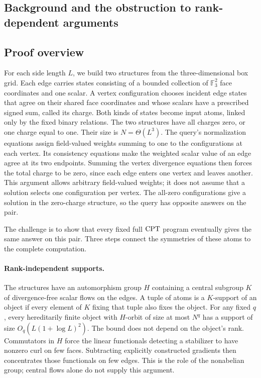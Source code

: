 \subsection{Background and the obstruction to rank-dependent arguments}


\subsection{Proof overview}

For each side length $L$, we build two structures from the
three-dimensional box grid. Each edge carries states consisting of a
bounded collection of $\mathbb F_3^2$ face coordinates and one scalar.
A vertex configuration chooses incident edge states that agree on their
shared face coordinates and whose scalars have a prescribed signed sum,
called its charge. Both kinds of
states become input atoms, linked only by the fixed binary relations.
The two structures have all charges zero, or one charge equal to one.
Their size is $N=\Theta(L^3)$. The query's normalization equations assign
field-valued weights summing to one to the configurations at each vertex.
Its consistency equations make the weighted scalar value of an edge
agree at its two endpoints. Summing the vertex divergence equations then
forces the total charge to be zero, since each edge enters one vertex and
leaves another. This argument allows arbitrary field-valued weights;
it does not assume that a solution selects one configuration per vertex.
The all-zero configurations give a solution in the zero-charge structure,
so the query has opposite answers on the pair.

The challenge is to show that every fixed full $\mathrm{CPT}$ program eventually
gives the same answer on this pair. Three steps connect the symmetries of
these atoms to the complete computation.

\paragraph{Rank-independent supports.}
The structures have an automorphism group $H$ containing a central
subgroup $K$ of divergence-free scalar flows on the edges. A tuple of
atoms is a $K$-support of an object if every element of $K$ fixing that
tuple also fixes the object. For any fixed $q$, every hereditarily finite
object with $H$-orbit of size at most $N^q$ has a support of size
$O_q(L(1+\log L)^2)$. The bound does not depend on the object's rank.
Commutators in $H$ force the linear functionals detecting a stabilizer
to have nonzero curl on few faces. Subtracting explicitly constructed
gradients then concentrates those functionals on few edges. This is the
role of the nonabelian group; central flows alone do not supply this
argument.


